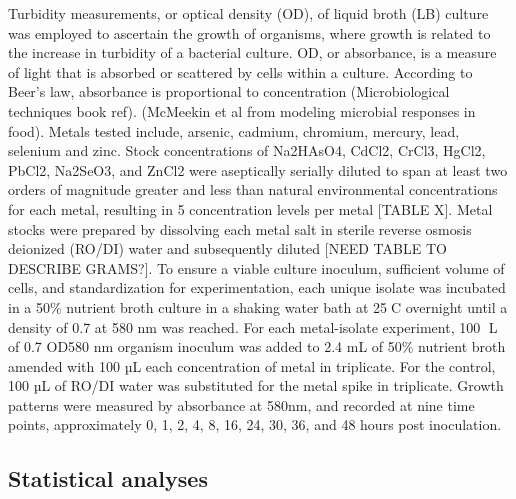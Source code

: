 \documentclass[ms]{uncgdissertationexp}
\theoremstyle{plain}
\theoremstyle{definition}
\theoremstyle{remark}
\begin{document}
  Turbidity measurements, or optical density (OD), of liquid broth (LB)
  culture was employed to ascertain the growth of organisms, where growth
  is related to the increase in turbidity of a bacterial culture. OD, or
  absorbance, is a measure of light that is absorbed or scattered by cells
  within a culture. According to Beer's law, absorbance is proportional to
  concentration (Microbiological techniques book ref). (McMeekin et al
  from modeling microbial responses in food). Metals tested include,
  arsenic, cadmium, chromium, mercury, lead, selenium and zinc. Stock
  concentrations of Na2HAsO4, CdCl2, CrCl3, HgCl2, PbCl2, Na2SeO3, and
  ZnCl2 were aseptically serially diluted to span at least two orders of
  magnitude greater and less than natural environmental concentrations for
  each metal, resulting in 5 concentration levels per metal {[}TABLE X{]}.
  Metal stocks were prepared by dissolving each metal salt in sterile
  reverse osmosis deionized (RO/DI) water and subsequently diluted {[}NEED
  TABLE TO DESCRIBE GRAMS?{]}. To ensure a viable culture inoculum,
  sufficient volume of cells, and standardization for experimentation,
  each unique isolate was incubated in a 50\% nutrient broth culture in a
  shaking water bath at 25C overnight until a density of 0.7 at 580 nm
  was reached. For each metal-isolate experiment, 100 L of 0.7 OD580 nm
  organism inoculum was added to 2.4 mL of 50\% nutrient broth amended
  with 100 µL each concentration of metal in triplicate. For the control,
  100 µL of RO/DI water was substituted for the metal spike in triplicate.
  Growth patterns were measured by absorbance at 580nm, and recorded at
  nine time points, approximately 0, 1, 2, 4, 8, 16, 24, 30, 36, and 48
  hours post inoculation.
  
  \subsection{Statistical analyses}\label{statistical-analyses}
  
\end{document}
